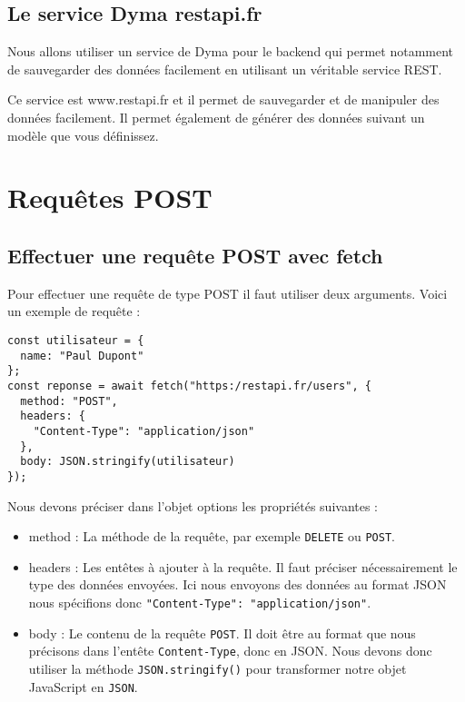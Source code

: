 \subsection{Le service Dyma restapi.fr}
Nous allons utiliser un service de Dyma pour le backend qui permet notamment de sauvegarder des données facilement en utilisant un véritable service REST.

Ce service est {\color{monOrange}www.restapi.fr} et il permet de sauvegarder et de manipuler des données facilement. Il permet également de générer des données suivant un modèle que vous définissez.

\section{Requêtes POST}
\subsection{Effectuer une requête POST avec fetch}
Pour effectuer une requête de type POST il faut utiliser deux arguments. Voici un exemple de requête :
\begin{verbatim}
const utilisateur = {
  name: "Paul Dupont"
};
const reponse = await fetch("https:/restapi.fr/users", {
  method: "POST",
  headers: {
    "Content-Type": "application/json"
  },
  body: JSON.stringify(utilisateur)
});
\end{verbatim}
Nous devons préciser dans l'objet options les propriétés suivantes :
\begin{itemize}
\item {\color{monOrange}method } : La méthode de la requête, par exemple {\tt  DELETE} ou {\tt  POST}.
\item {\color{monOrange}headers} : Les entêtes à ajouter à la requête. Il faut préciser nécessairement le type des données envoyées. Ici nous envoyons des données au format JSON nous spécifions donc {\tt  "Content-Type": "application/json"}.
\item {\color{monOrange}body }: Le contenu de la requête {\tt  POST}. Il doit être au format que nous précisons dans l'entête {\tt  Content-Type}, donc en JSON. Nous devons donc utiliser la méthode {\tt  JSON.stringify()} pour transformer notre objet JavaScript en {\tt  JSON}.

\end{itemize}

